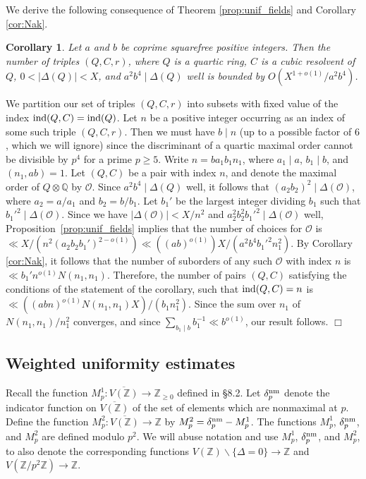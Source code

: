 \documentclass{article}
\def\Z{{\mathbb Z}}
\def\O{{\mathcal O}}
\def\ind{{\rm ind}}
\def\nm{{\rm nm}}
\def\Q{{\mathbb Q}}
\def\Z{{\mathbb Z}}
\def\Q{{\mathbb Q}}
\def\ol{\overline}
\newtheorem{corollary}[theorem]{Corollary}
\newenvironment{proof}{\noindent {\bf Proof:}}{$\Box$ \vspace{2 ex}}
\begin{document}
We derive the following consequence of Theorem \ref{prop:unif_fields} and Corollary \ref{cor:Nak}.
\begin{corollary}\label{cor:uniformabestimate}
Let $a$ and $b$ be coprime squarefree positive integers. Then the number of triples $(Q,C,r)$, where $Q$ is a quartic ring, $C$ is a cubic resolvent of $Q$, $0<|\Delta(Q)|<X$, and $a^2b^4\mid\Delta(Q)$ well is bounded by $O(X^{1+o(1)}/a^{2}b^{4})$.
\end{corollary}
\begin{proof}
We partition our set of triples $(Q,C,r)$ into subsets with fixed value of the index $\ind(Q,C)=\ind(Q)$. Let $n$ be a positive integer occurring as an index of some such triple $(Q,C,r)$. Then we must have $b\mid n$ (up to a possible factor of $6$, which we will ignore) since the discriminant of a quartic maximal order cannot be divisible by $p^4$ for a prime $p\geq 5$. Write $n=ba_1b_1n_1$, where $a_1\mid a$, $b_1\mid b$, and $(n_1,ab)=1$. Let $(Q,C)$ be a pair with index $n$, and denote the maximal order of $Q\otimes\Q$ by $\O$. Since $a^2b^4\mid\Delta(Q)$ well, it follows that $(a_2b_2)^2\mid\Delta(\O)$, where $a_2=a/a_1$ and $b_2=b/b_1$. Let $b_1'$ be the largest integer dividing $b_1$ such that $b_1'^2\mid\Delta(\O)$. 
Since we have $|\Delta(\O)|<X/n^2$ and $a_2^2b_2^2b_1'^2\mid\Delta(\O)$ well, Proposition~\ref{prop:unif_fields} implies that the number of choices for $\O$ is $\ll X/(n^2(a_2b_2b_1')^{2-o(1)})\ll ((ab)^{o(1)})X/(a^2b^4b_1'^2n_1^2)$.
By Corollary \ref{cor:Nak}, it follows that the number of suborders of any such $\O$ with index $n$ is $\ll b_1'n^{o(1)} N(n_1,n_1)$. Therefore, the number of pairs $(Q,C)$ satisfying the conditions of the statement of the corollary, such that $\ind(Q,C)=n$ is $\ll ((abn)^{o(1)} N(n_1,n_1)X)/(b_1n_1^2)$. Since the sum over $n_1$ of $N(n_1,n_1)/n_1^2$ converges, and since $\sum_{b_1\mid b}b_1^{-1}\ll b^{o(1)}$, our result follows.
\end{proof}


\subsection{Weighted uniformity estimates}

Recall the function $M_p^1:\ol{V(\Z)}\to\Z_{\geq 0}$ defined in \S8.2. Let $\delta_p^{\nm}$ denote the indicator function on $\ol{V(\Z)}$ of the set of elements which are nonmaximal at $p$. Define the function $M_p^2:\ol{V(\Z)}\to\Z$ by $M_p^2=\delta_p^\nm-M_p^1$. The functions $M_p^1$, $\delta_p^\nm$, and $M_p^2$ are defined modulo $p^2$. We will abuse notation and use $M_p^1$, $\delta_p^\nm$, and $M_p^2$, to also denote the corresponding functions $V(\Z)\backslash\{\Delta = 0\}\to\Z$ and $V(\Z/p^2\Z)\to\Z$.
\end{document}
